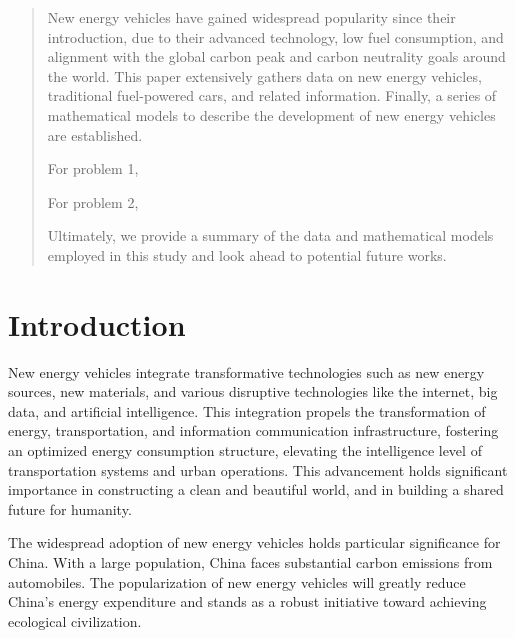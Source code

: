 \documentclass{apmcmthesis}
\begin{document}
\pagestyle{frontmatterstyle}

\begin{abstract}

New energy vehicles have gained widespread popularity since their introduction, due to their advanced technology, low fuel consumption, and alignment with the global carbon peak and carbon neutrality goals around the world. This paper extensively gathers data on new energy vehicles, traditional fuel-powered cars, and related information. Finally, a series of mathematical models to describe the development of new energy vehicles are established.

For problem 1,

For problem 2, 

Ultimately, we provide a summary of the data and mathematical models employed in this study and look ahead to potential future works.


\end{abstract}


\newpage
\tableofcontents


\newpage
\pagestyle{mainmatterstyle}
\setcounter{page}{1}
\section{Introduction}




New energy vehicles integrate transformative technologies such as new energy sources, new materials, and various disruptive technologies like the internet, big data, and artificial intelligence. This integration propels the transformation of energy, transportation, and information communication infrastructure, fostering an optimized energy consumption structure, elevating the intelligence level of transportation systems and urban operations. This advancement holds significant importance in constructing a clean and beautiful world, and in building a shared future for humanity.

The widespread adoption of new energy vehicles holds particular significance for China. With a large population, China faces substantial carbon emissions from automobiles. The popularization of new energy vehicles will greatly reduce China's energy expenditure and stands as a robust initiative toward achieving ecological civilization.
\end{document}
